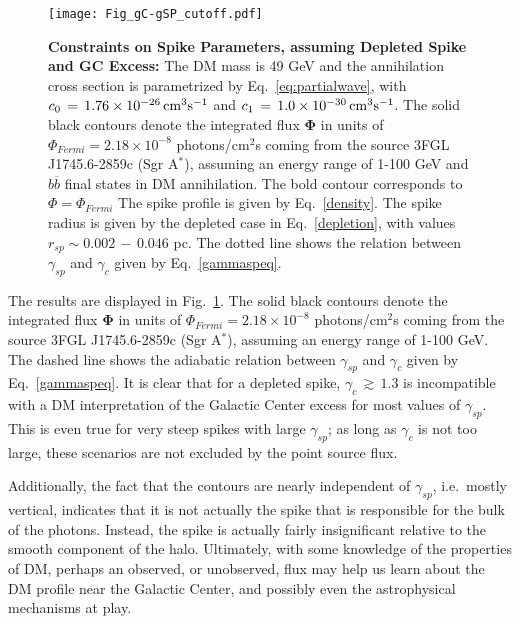 \documentclass[11pt]{article}
\begin{document}
   \begin{figure}[ht]
  \centering
  {\texttt{[image: Fig\_gC-gSP\_cutoff.pdf]}}
    \caption{\textbf{Constraints on Spike Parameters, assuming Depleted Spike and GC Excess:} The DM mass is 49 GeV and the annihilation cross section is parametrized by Eq.~\ref{eq:partialwave}, with $c_0 \, = \, 1.76 \times 10^{-26} \, {\rm cm}^{3} {\rm s}^{-1}$ and $c_1 \, = \, 1.0 \times 10^{-30} \, {\rm cm}^{3} {\rm s}^{-1}$. The solid black contours denote the integrated flux $\mathbf{\Phi}$ in units of $ \Phi_{Fermi} = 2.18 \times 10^{-8}$ photons/cm$^2$s coming from the source 3FGL J1745.6-2859c (Sgr A$^*$), assuming an energy range of 1-100 GeV and $b \overline{b}$ final states in DM annihilation. The bold contour corresponds to $\Phi = \Phi_{Fermi}$  The spike profile is given by Eq.~\ref{density}. The spike radius is given by the depleted case in Eq.~\ref{depletion}, with values $r_{sp} \sim 0.002 \, - \, 0.046$ pc. The dotted line shows the relation between $\gamma_{sp}$ and $\gamma_c$ given by Eq.~\ref{gammaspeq}.}
    \label{GCflux}
\end{figure}



The results are displayed in Fig.~\ref{GCflux}. The solid black contours denote the integrated flux $\mathbf{\Phi}$ in units of $ \Phi_{Fermi} = 2.18 \times 10^{-8}$ photons/cm$^2$s coming from the source 3FGL J1745.6-2859c (Sgr A$^*$), assuming an energy range of 1-100 GeV. The dashed line shows the adiabatic relation between $\gamma_{sp}$ and $\gamma_c$ given by Eq.~\ref{gammaspeq}. It is clear that for a depleted spike, $\gamma_c \, \gtrsim \, 1.3$ is incompatible with a DM interpretation of the Galactic Center excess for most values of $\gamma_{sp}$.  This is even true for very steep spikes with large $\gamma_{sp}$; as long as $\gamma_c$ is not too large, these scenarios are not excluded by the point source flux.

Additionally, the fact that the contours are nearly independent of $\gamma_{sp}$, i.e.~mostly vertical, indicates that it is not actually the spike that is responsible for the bulk of the photons.  Instead, the spike is actually fairly insignificant relative to the smooth component of the halo.  Ultimately, with some knowledge of the properties of DM, perhaps an observed, or unobserved, flux may help us learn about the DM profile near the Galactic Center, and possibly even the astrophysical mechanisms at play.
\end{document}
